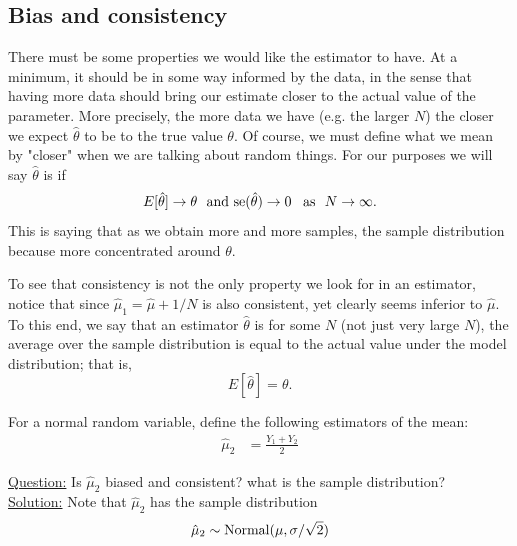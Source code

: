 \subsection{Bias and consistency}

 There must be some properties we would like the estimator to have. At a minimum, it should be in some way informed by the data, in the sense that having more data should bring our estimate closer to the actual value of the parameter. More precisely, the more data we have (e.g. the larger $N$) the closer we expect $\hat{\theta}$ to be to the true value $\theta$. Of course, we must define what we mean by "closer" when we are talking about random things. 
For our purposes we will say $\hat{\theta}$ is  if 
\begin{equation*}
E[\hat{\theta}] \to \theta\,\,\text{ and } {\rm se}(\hat{\theta})  \to 0 \,\,\,\text{ as }\,\, N\to \infty. 
\end{equation*}
This is saying that as we obtain more and more samples, the sample distribution because more concentrated around $\theta$. 


To see that consistency is not the only property we look for in an estimator, notice that since $\hat{\mu}_1 = \hat{\mu} + 1/N$ is also consistent, yet clearly seems inferior to $\hat{\mu}$. To this end, we say that an estimator $\hat{\theta}$ is  for some $N$ (not just very large $N$), the average over the sample distribution is equal to the actual value under the model distribution; that is, 
\begin{equation*}
E[\hat{\theta}] = \theta. 
\end{equation*} 

\begin{example}
For a normal random variable, define the following estimators of the mean:
\begin{align*}
\hat{\mu}_2 &= \frac{Y_1 + Y_2}{2}
\end{align*}

\noindent
\underline{Question:}  Is $\hat{\mu}_2$ biased and consistent? what is the sample distribution?\\


\noindent
\underline{Solution:}
Note that $\hat{\mu}_2$ has the sample distribution 
\begin{equation*}
\hat{\mu}_2  \sim {\rm Normal}(\mu,\sigma/\sqrt{2})
\end{equation*}
\end{example}


